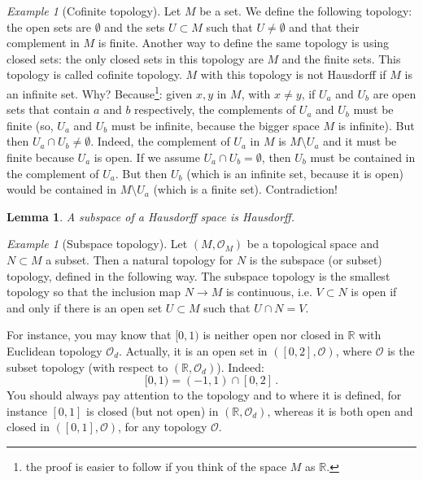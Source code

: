 \documentclass[a4paper,11pt,titlepage, article, oneside]{memoir}
\numberwithin{equation}{section}
\newtheorem{lemma}[theorem]{Lemma}
\theoremstyle{definition}
\theoremstyle{remark}
\newtheorem{example}[theorem]{Example}
\newcommand{\rfield}{\mathbb{R}}
\begin{document}
\begin{tcolorbox}\begin{example}[Cofinite topology]
Let $M$ be a set. We define the following topology: the open sets are $\emptyset$ and the sets $U \subset M$ such that $U \not = \emptyset$ and that their complement in $M$ is finite. Another way to define the same topology is using closed sets: the only closed sets in this topology are $M$ and the finite sets. This topology is called cofinite topology.
$M$ with this topology is not Hausdorff if $M$ is an infinite set.
Why? Because\footnote{the proof is easier to follow if you think of the space $M$ as $\rfield$.}: given $x, y$ in $M$, with $ x \not = y$, if $U_a$ and $U_b$ are open sets that contain $a$ and $b$ respectively, the complements of $U_a$ and $U_b$ must be finite (so, $U_a$ and $U_b$ must be infinite, because the bigger space $M$ is infinite).
But then $U_a \cap U_b \not = \emptyset$. Indeed, the complement of $U_a$ in $M$ is $M \setminus U_a$ and it must be finite because $U_a$ is open.
If we assume $U_a \cap U_b = \emptyset$, then $U_b$ must be contained in the complement of $U_a$. But then $U_b$ (which is an infinite set, because it is open) would be contained in $M \setminus U_a$ (which is a finite set). Contradiction!
\end{example}\end{tcolorbox}

\begin{lemma}
A subspace of a Hausdorff space is Hausdorff.
\end{lemma}

\begin{tcolorbox}\begin{example}[Subspace topology]
Let $(M, \mathcal{O}_M)$ be a topological space and $N \subset M$ a subset. Then a natural topology for $N$ is the subspace (or subset) topology, defined in the following way. The subspace topology is the smallest topology so that the inclusion map $N \rightarrow M$ is continuous, i.e. $V \subset N$ is open if and only if there is an open set $U \subset M$ such that $U \cap N = V$.

For instance, you may know that $[0, 1)$ is neither open nor closed in $\rfield$ with Euclidean topology $\mathcal{O}_d$. Actually, it is an open set in $([0, 2], \mathcal{O})$, where $\mathcal{O}$ is the subset topology (with respect to $(\rfield, \mathcal{O}_d)$). Indeed:
\[ [0, 1) = (-1, 1) \cap [0, 2]\, . \]
You should always pay attention to the topology and to where it is defined, for instance $[0, 1]$ is closed (but not open) in $(\rfield, \mathcal{O}_d)$, whereas it is both open and closed in $([0, 1], \mathcal{O})$, for any topology $\mathcal{O}$.
\end{example}\end{tcolorbox}
\end{document}
